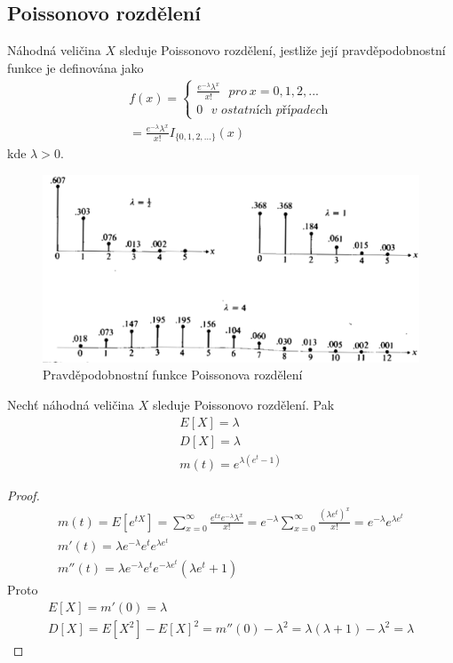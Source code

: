 \subsection{Poissonovo rozdělení}

\begin{definition}
Náhodná veličina $X$ sleduje Poissonovo rozdělení, jestliže její pravděpodobnostní funkce je definována jako
\begin{gather*}
f(x) =
\begin{cases}
\frac{e^{-\lambda}\lambda^x}{x!}~~~\textit{pro}~x = 0,1,2, ...\\
0 ~~~\textit{v ostatních případech}
\end{cases}\\
= \frac{e^{-\lambda}\lambda^x}{x!}I_{\{0,1,2, ...\}}(x)
\end{gather*}
kde $\lambda > 0$.
\end{definition}

\begin{figure}[htp]
\centering
\includegraphics[scale = 0.35]{pictures/poisson_distribution.eps}
\caption{Pravděpodobnostní funkce Poissonova rozdělení}
\label{poisson_distribution}
\end{figure}

\begin{theorem}
Nechť náhodná veličina $X$ sleduje Poissonovo rozdělení. Pak
\begin{gather*}
E[X] = \lambda\\
D[X] = \lambda\\
m(t) = e^{\lambda (e^t - 1)}
\end{gather*}
\end{theorem}

\begin{proof}
\begin{gather*}
m(t) = E[e^{tX}] = \sum_{x = 0}^{\infty} \frac{e^{tx} e^{-\lambda} \lambda^x}{x!} = e^{-\lambda} \sum_{x = 0}^{\infty} \frac{(\lambda e^t)^x}{x!} = e^{-\lambda}e^{\lambda e^t}\\
m'(t) = \lambda e^{-\lambda} e^t e^{\lambda e^t}\\
m''(t) = \lambda e^{-\lambda} e^t e^{-\lambda e^t}(\lambda e^t + 1)
\end{gather*}
Proto
\begin{gather*}
E[X] = m'(0) = \lambda\\
D[X] = E[X^2] - E[X]^2 = m''(0) - \lambda^2 = \lambda(\lambda + 1) - \lambda^2 = \lambda
\end{gather*}
\end{proof}

